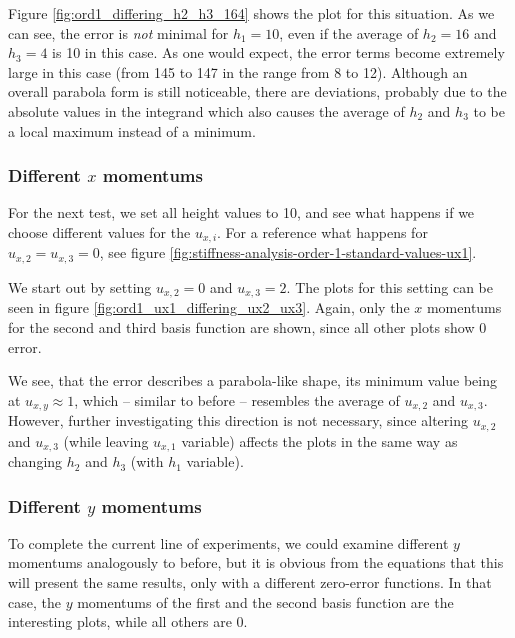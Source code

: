 \documentclass{article}
\begin{document}


Figure \ref{fig:ord1_differing_h2_h3_164} shows the plot for this situation. As we can see, the error is \emph{not} minimal for $h_1=10$, even if the average of $h_2=16$ and $h_3=4$ is 10 in this case. As one would expect, the error terms become extremely large in this case (from 145 to 147 in the range from 8 to 12). Although an overall parabola form is still noticeable, there are deviations, probably due to the absolute values in the integrand which also causes the average of $h_2$ and $h_3$ to be a local maximum instead of a minimum.

\subsubsection{\texorpdfstring{Different $x$ momentums}{Different x momentums}}
\label{sec:stiffness-analysis-ord1-nonstandard-diff-ux}

For the next test, we set all height values to 10, and see what happens if we choose different values for the $u_{x,i}$. For a reference what happens for $u_{x,2}=u_{x,3}=0$, see figure \ref{fig:stiffness-analysis-order-1-standard-values-ux1}.

We start out by setting $u_{x,2}=0$ and $u_{x,3}=2$. The plots for this setting can be seen in figure \ref{fig:ord1_ux1_differing_ux2_ux3}. Again, only the $x$ momentums for the second and third basis function are shown, since all other plots show 0 error.



We see, that the error describes a parabola-like shape, its minimum value being at $u_{x,y}\approx 1$, which -- similar to before -- resembles the average of $u_{x,2}$ and $u_{x,3}$. However, further investigating this direction is not necessary, since altering $u_{x,2}$ and $u_{x,3}$ (while leaving $u_{x,1}$ variable) affects the plots in the same way as changing $h_2$ and $h_3$ (with $h_1$ variable).

\subsubsection{\texorpdfstring{Different $y$ momentums}{Different y momentums}}
\label{sec:stiffness-analysis-ord1-nonstandard-diff-uy}

To complete the current line of experiments, we could examine different $y$ momentums analogously to before, but it is obvious from the equations that this will present the same results, only with a different zero-error functions. In that case, the $y$ momentums of the first and the second basis function are the interesting plots, while all others are 0.
\end{document}
